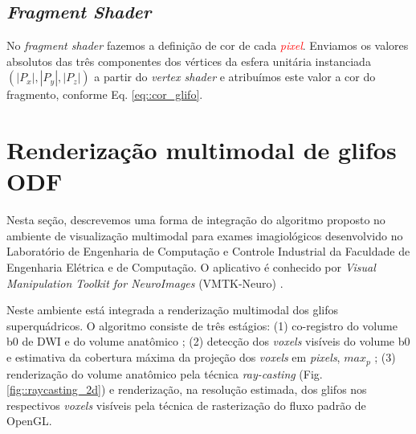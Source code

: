 
\subsection{\textit{Fragment Shader}}

No \textit{fragment shader} fazemos a definição de cor de cada \textcolor{red}{\textit{pixel}}. Enviamos os valores absolutos das três componentes dos vértices da esfera unitária instanciada $(|P_x|, |P_y|, |P_z|)$ a partir do \textit{vertex shader} e atribuímos este valor a cor do fragmento, conforme Eq. \ref{eq::cor_glifo}.


\section{Renderização multimodal de glifos ODF}
\label{sec::superquadricas}

Nesta seção, descrevemos uma forma de integração do algoritmo proposto no 
ambiente de visualização multimodal para exames imagiológicos desenvolvido no Laboratório de Engenharia de Computação e Controle Industrial da Faculdade de Engenharia Elétrica e de Computação. O aplicativo é conhecido por \textit{Visual Manipulation Toolkit for NeuroImages} (VMTK-Neuro) \cite{VMTKNeuro}.

Neste ambiente está integrada a renderização multimodal dos glifos superquádricos. O algoritmo consiste de três estágios: (1) co-registro do volume b0 de DWI e do volume anatômico  \cite{ting2014}; (2) detecção dos \textit{voxels} visíveis do volume b0 e estimativa da cobertura máxima da projeção dos \textit{voxels} em \textit{pixels}, $max_p$ \cite{voltoline2021}; (3) renderização do volume anatômico pela técnica \textit{ray-casting} (Fig. \ref{fig::raycasting_2d}) \cite{kruger2003} e renderização, na resolução estimada, dos glifos nos respectivos \textit{voxels} visíveis pela técnica de rasterização do fluxo padrão de OpenGL.


